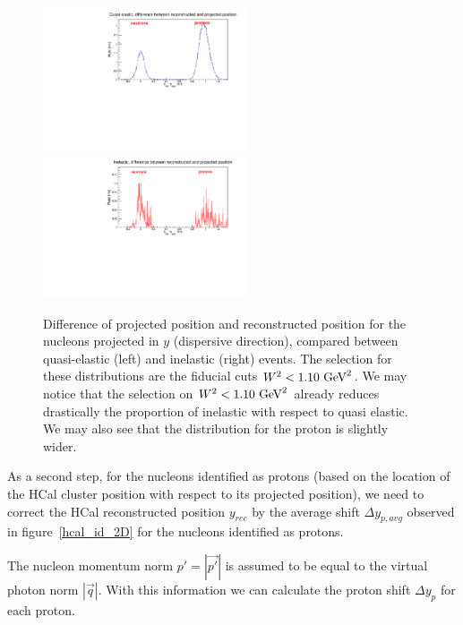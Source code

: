 \documentclass[11pt]{article}
\begin{document}
\begin{figure}[!h]
  \centering
    \includegraphics[width=6cm]{HCal_PID_QE_y.pdf}
    \includegraphics[width=6cm]{HCal_PID_Inel_y.pdf}
    \caption{Difference of projected position and reconstructed position for the nucleons projected in $y$ (dispersive direction), compared between quasi-elastic (left) and inelastic (right) events. The selection for these distributions are the fiducial cuts $W^2<1.10~{\rm GeV}^2$. We may notice that the selection on $W^2<1.10~{\rm GeV}^2$ already reduces drastically the proportion of inelastic with respect to quasi elastic. We may also see that the distribution for the proton is slightly wider. %
    }
    \label{hcal_id_y}
\end{figure}
%

As a second step, for the nucleons identified as protons (based on the location of the HCal cluster position with respect to its projected position), we need to correct the HCal reconstructed position $y_{rec}$ by the average shift $\Delta y_{p, avg}$ observed in figure~\ref{hcal_id_2D} for the nucleons identified as protons.

The nucleon momentum norm $p' = |\vec{p'}|$ is assumed to be equal to the virtual photon norm $|\vec{q}|$.
With this information we can calculate the proton shift $\Delta y_{p}$ for each proton.
\end{document}

